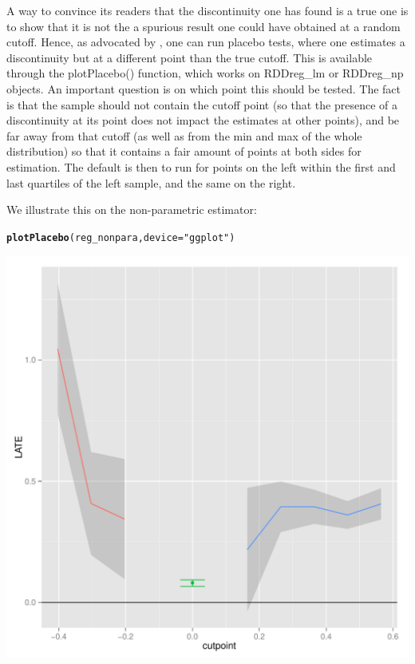 \documentclass[english,nojss]{jss}\usepackage{graphicx, color}
\makeatletter
\def\maxwidth{ %
  \ifdim\Gin@nat@width>\linewidth
    \linewidth
  \else
    \Gin@nat@width
  \fi
}
\newcommand{\hlfunctioncall}[1]{\textcolor[rgb]{0.501960784313725,0,0.329411764705882}{\textbf{#1}}}%
\newcommand{\hlstring}[1]{\textcolor[rgb]{0.6,0.6,1}{#1}}%
\newenvironment{kframe}{%
 \def\at@end@of@kframe{}%
 \ifinner\ifhmode%
  \def\at@end@of@kframe{\end{minipage}}%
  \begin{minipage}{\columnwidth}%
 \fi\fi%
 \def\FrameCommand##1{\hskip\@totalleftmargin \hskip-\fboxsep
 \colorbox{shadecolor}{##1}\hskip-\fboxsep
     \hskip-\linewidth \hskip-\@totalleftmargin \hskip\columnwidth}%
 \MakeFramed {\advance\hsize-\width
   \@totalleftmargin\z@ \linewidth\hsize
   \@setminipage}}%
 {\par\unskip\endMakeFramed%
 \at@end@of@kframe}
\newenvironment{knitrout}{}{} %
\makeatother
\begin{document}
A way to convince its readers that the discontinuity one has found
is a true one is to show that it is not the a spurious result one
could have obtained at a random cutoff. Hence, as advocated by \citet{ImbensLemieux2008},
one can run placebo tests, where one estimates a discontinuity but
at a different point than the true cutoff. This is available through
the plotPlacebo() function, which works on RDDreg\_lm or RDDreg\_np
objects. An important question is on which point this should be tested.
The fact is that the sample should not contain the cutoff point (so
that the presence of a discontinuity at its point does not impact
the estimates at other points), and be far away from that cutoff (as
well as from the min and max of the whole distribution) so that it
contains a fair amount of points at both sides for estimation. The
default is then to run for points on the left within the first and
last quartiles of the left sample, and the same on the right.

We illustrate this on the non-parametric estimator:

\begin{knitrout}
\color{fgcolor}\begin{kframe}
\begin{alltt}
\hlfunctioncall{plotPlacebo}(reg_nonpara, device = \hlstring{"ggplot"})
\end{alltt}
\end{kframe}
\includegraphics[width=\maxwidth]{figure/unnamed-chunk-15} 

\end{knitrout}
\end{document}
